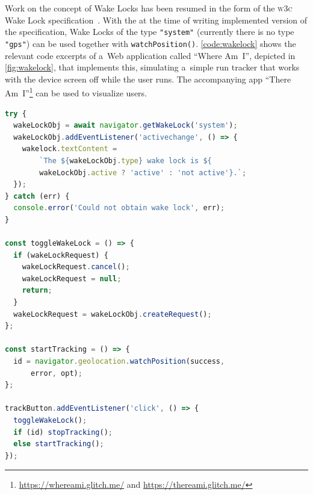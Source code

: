 \documentclass[sigconf,hyphens]{acmart}
\begin{document}
Work on the concept of Wake Locks has been resumed in the form of the \textsc{w3c}
Wake Lock specification~\cite{bogdanovich2017wakelock}.
With the at the time of writing implemented version of the specification,
Wake Locks of the type \texttt{"system"}
(currently there is no type \texttt{"gps"}) can be used together with \texttt{watchPosition()}.
\autoref{code:wakelock} shows the relevant code excerpts of a~Web application
called ``Where Am~I'', depicted in \autoref{fig:wakelock}, that implements this,
simulating a~simple run tracker that works with the device screen off while the user runs.
The accompanying app ``There Am~I''\footnote{\url{https://whereami.glitch.me/} and
\url{https://thereami.glitch.me/}} can be used to visualize users.

\begin{lstlisting}[caption={Using the Wake Lock \textsc{api} for background geolocation tracking},
  label=code:wakelock, language=JavaScript, float=h] 
try {
  wakeLockObj = await navigator.getWakeLock('system');
  wakeLockObj.addEventListener('activechange', () => {
    wakelock.textContent =
        `The ${wakeLockObj.type} wake lock is ${
        wakeLockObj.active ? 'active' : 'not active'}.`;
  });
} catch (err) {
  console.error('Could not obtain wake lock', err);
}

const toggleWakeLock = () => {
  if (wakeLockRequest) {
    wakeLockRequest.cancel();
    wakeLockRequest = null;      
    return;
  }
  wakeLockRequest = wakeLockObj.createRequest();
};
    
const startTracking = () => {  
  id = navigator.geolocation.watchPosition(success,
      error, opt);  
};

trackButton.addEventListener('click', () => {
  toggleWakeLock();    
  if (id) stopTracking();
  else startTracking();
});
\end{lstlisting}
\end{document}
